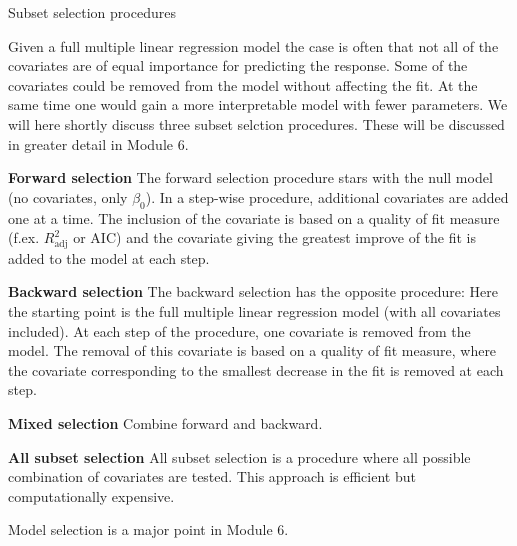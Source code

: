 \documentclass[ignorenonframetext,]{beamer}
\begin{document}
\begin{frame}

\begin{block}{Subset selection procedures}

Given a full multiple linear regression model the case is often that not
all of the covariates are of equal importance for predicting the
response. Some of the covariates could be removed from the model without
affecting the fit. At the same time one would gain a more interpretable
model with fewer parameters. We will here shortly discuss three subset
selction procedures. These will be discussed in greater detail in Module
6.

\textbf{Forward selection} The forward selection procedure stars with
the null model (no covariates, only \(\beta_0\)). In a step-wise
procedure, additional covariates are added one at a time. The inclusion
of the covariate is based on a quality of fit measure (f.ex.
\(R^2_{\text{adj}}\) or AIC) and the covariate giving the greatest
improve of the fit is added to the model at each step.

\end{block}

\end{frame}

\begin{frame}

\textbf{Backward selection} The backward selection has the opposite
procedure: Here the starting point is the full multiple linear
regression model (with all covariates included). At each step of the
procedure, one covariate is removed from the model. The removal of this
covariate is based on a quality of fit measure, where the covariate
corresponding to the smallest decrease in the fit is removed at each
step.

\textbf{Mixed selection} Combine forward and backward.

\textbf{All subset selection} All subset selection is a procedure where
all possible combination of covariates are tested. This approach is
efficient but computationally expensive.

Model selection is a major point in Module 6.

\end{frame}
\end{document}
